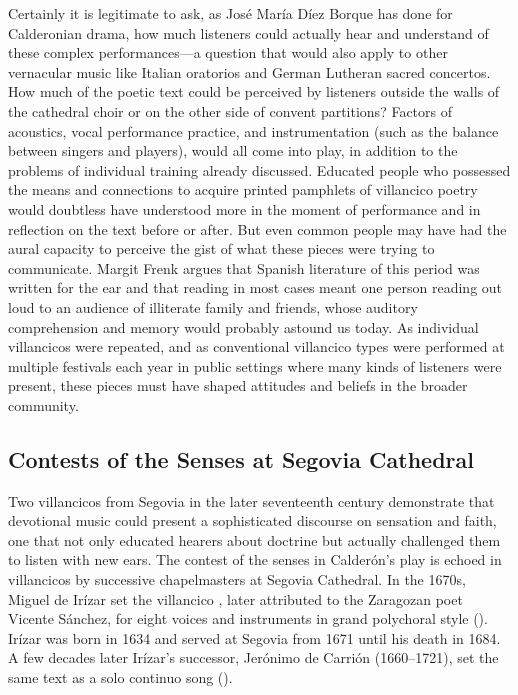 Certainly it is legitimate to ask, as José María Díez Borque has done for
Calderonian drama, how much listeners could actually hear and understand of
these complex performances---a question that would also apply to other
vernacular music like Italian oratorios and German Lutheran sacred concertos.%
    \Autocite{DiezBorque:Publico}
How much of the poetic text could be perceived by listeners outside the walls of
the cathedral choir or on the other side of convent partitions? Factors of
acoustics, vocal performance practice, and instrumentation (such as the balance
between singers and players), would all come into play, in addition to the
problems of individual training already discussed.  
Educated people who possessed the means and connections to acquire printed
pamphlets of villancico poetry would doubtless have understood more in the
moment of performance and in reflection on the text before or after.
But even common people may have had the aural capacity to perceive the gist of
what these pieces were trying to communicate.
Margit Frenk argues that Spanish literature of this period was written for the
ear and that reading in most cases meant one person reading out loud to an
audience of illiterate family and friends, whose auditory comprehension and
memory would probably astound us today.%
    \Autocite{Frenk:Voz}  
As individual villancicos were repeated, and as conventional villancico types
were performed at multiple festivals each year in public settings where many
kinds of listeners were present, these pieces must have shaped attitudes and
beliefs in the broader community.


\subsection{Contests of the Senses at Segovia Cathedral}

Two villancicos from Segovia in the later seventeenth century demonstrate that
devotional music could present a sophisticated discourse on sensation and faith,
one that not only educated hearers about doctrine but actually challenged them
to listen with new ears.  
The contest of the senses in Calderón's play is echoed in villancicos by
successive chapelmasters at Segovia Cathedral.
In the 1670s, Miguel de Irízar set the villancico , later attributed to the Zaragozan poet Vicente Sánchez,
for eight voices and instruments in grand polychoral style ().%
    \Autocite{LopezCalo:Segovia}
Irízar was born in 1634 and served at Segovia from 1671 until his death in 1684.
A few decades later Irízar's successor, Jerónimo de Carrión (1660--1721), set
the same text as a solo continuo song ().%
    \Autocite[133--152]{Cashner:WLSCM32}

